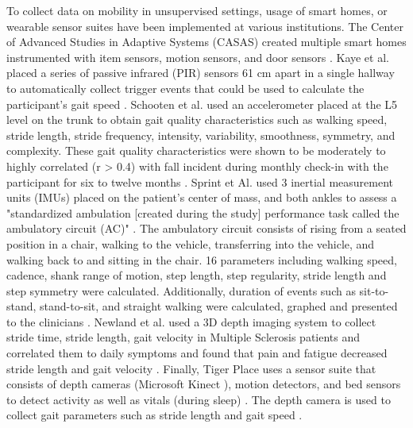 To collect data on mobility in unsupervised settings, usage of smart homes, or wearable sensor suites 
have been implemented at various institutions. The Center of Advanced Studies in Adaptive Systems (CASAS) 
created multiple smart homes instrumented with item sensors, motion sensors, and door sensors \cite{wang_multi-person_2022}. 
Kaye et al. placed a series of passive infrared (PIR) sensors 61 cm apart in a single hallway to 
automatically collect trigger events that could be used to calculate the participant's gait speed \cite{kaye_one_2012}. 
Schooten et al. used an accelerometer placed at the L5 level on the trunk to obtain gait quality 
characteristics such as walking speed, stride length, stride frequency, intensity, variability, 
smoothness, symmetry, and complexity. These gait quality characteristics were shown to be moderately to 
highly correlated (r > 0.4) with fall incident during monthly check-in with the participant for six to 
twelve months \cite{schooten_daily-life_2016}. Sprint et Al. used 3 inertial measurement units (IMUs) placed on the patient's center 
of mass, and both ankles to assess a "standardized ambulation [created during the study] performance task 
called the ambulatory circuit (AC)" \cite{sprint_designing_2016}. The ambulatory circuit consists of rising from a seated position 
in a chair, walking to the vehicle, transferring into the vehicle, and walking back to and sitting in the 
chair. 16 parameters including walking speed, cadence, shank range of motion, step length, step regularity, 
stride length and step symmetry were calculated. Additionally, duration of events such as sit-to-stand, 
stand-to-sit, and straight walking were calculated, graphed and presented to the clinicians \cite{sprint_designing_2016}. 
Newland et al. used a 3D depth imaging system to collect stride time, stride length, gait velocity in 
Multiple Sclerosis patients and correlated them to daily symptoms and found that pain and fatigue 
decreased stride length and gait velocity \cite{newland_continuous_2017}. Finally, Tiger Place uses a sensor suite that consists 
of depth cameras (Microsoft Kinect \cite{stone_unobtrusive_2013}), motion detectors, and bed sensors to detect activity as well 
as vitals (during sleep) \cite{ward_human-centered_2020}. The depth camera is used to collect gait parameters such as stride length 
and gait speed \cite{stone_unobtrusive_2013}.

